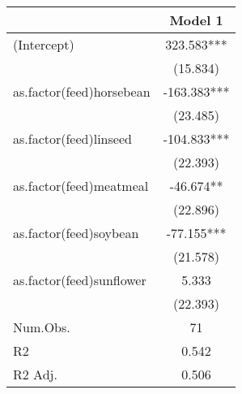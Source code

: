 
\begin{tabular}[t]{lc}
\toprule
  & Model 1\\
\midrule
(Intercept) & 323.583***\\
 & (15.834)\\
as.factor(feed)horsebean & -163.383***\\
 & (23.485)\\
as.factor(feed)linseed & -104.833***\\
 & \vphantom{1} (22.393)\\
as.factor(feed)meatmeal & -46.674**\\
 & (22.896)\\
as.factor(feed)soybean & -77.155***\\
 & (21.578)\\
as.factor(feed)sunflower & 5.333\\
 & (22.393)\\
\midrule
Num.Obs. & 71\\
R2 & 0.542\\
R2 Adj. & 0.506\\
\bottomrule
\end{tabular}
